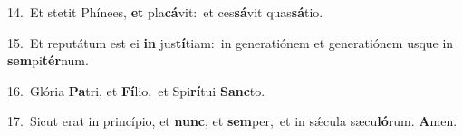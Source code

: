 {\numbfont\textcolor{\numbcolor}{14.}}~Et stetit Phínees, \textbf{et} pla\-\textbf{cá}\-vit:~\star et ces\-\textbf{sá}\-vit quas\-\textbf{sá}\-tio.\par
{\numbfont\textcolor{\numbcolor}{15.}}~Et reputátum est ei \textbf{in} jus\-\textbf{tí}\-tiam:~\star in generatiónem et generatiónem usque in \textbf{sem}\-pi\-\textbf{tér}\-num.\par
{\numbfont\textcolor{\numbcolor}{16.}}~Glória \textbf{Pa}\-tri, et \textbf{Fí}\-lio,~\star et Spi\-\textbf{rí}\-tui \textbf{Sanc}\-to.\par
{\numbfont\textcolor{\numbcolor}{17.}}~Sicut erat in princípio, et \textbf{nunc}\-, et \textbf{sem}\-per,~\star et in sǽcula sæcu\-\textbf{ló}\-rum. \textbf{A}\-men.\par
